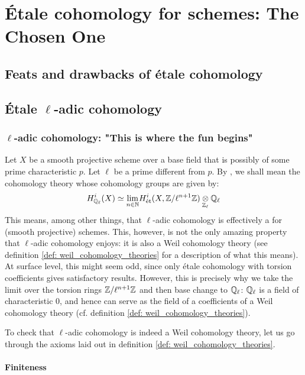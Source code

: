     \section{\'Etale cohomology for schemes: The Chosen One} 
        \subsection{Feats and drawbacks of \'etale cohomology}
            
        
        \subsection{\'Etale \texorpdfstring{$\ell$}{}-adic cohomology}
            \subsubsection{\texorpdfstring{$\ell$}{}-adic cohomology: "This is where the fun begins"}
                Let $X$ be a smooth projective scheme over a base field that is possibly of some prime characteristic $p$. Let $\ell$ be a prime different from $p$. By , we shall mean the cohomology theory whose cohomology groups are given by:
                    $$H^i_{\Q_{\ell}}(X) \cong \underset{n \in \N}{\lim} H_{\et}^i(X, \Z/\ell^{n + 1}\Z) \tensor_{\Z_{\ell}} \Q_{\ell}$$
                This means, among other things, that $\ell$-adic cohomology is effectively a  for (smooth projective) schemes. This, however, is not the only amazing property that $\ell$-adic cohomology enjoys: it is also a Weil cohomology theory (see definition \ref{def: weil_cohomology_theories} for a description of what this means). At surface level, this might seem odd, since only \'etale cohomology with torsion coefficients gives satisfactory results. However, this is precisely why we take the limit over the torsion rings $\mathbb{Z}/\ell^{n + 1}\mathbb{Z}$ and then base change to $\mathbb{Q}_{\ell}$: $\mathbb{Q}_{\ell}$ is a field of characteristic $0$, and hence can serve as the field of a coefficients of a Weil cohomology theory (cf. definition \ref{def: weil_cohomology_theories}). 
                
                To check that $\ell$-adic cohomology is indeed a Weil cohomology theory, let us  go through the axioms laid out in definition \ref{def: weil_cohomology_theories}.
            
                \paragraph{Finiteness}
            
